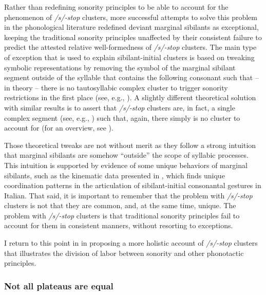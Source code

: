 Rather than redefining sonority principles to be able to account for the phenomenon of \emph{/s/-stop} clusters, more successful attempts to solve this problem in the phonological literature redefined deviant marginal sibilants as exceptional, keeping the traditional sonority principles unaffected by their consistent failure to predict the attested relative well-formedness of \emph{/s/-stop} clusters.
The main type of exception that is used to explain sibilant-initial clusters is based on tweaking symbolic representations by removing the symbol of the marginal sibilant segment outside of the syllable that contains the following consonant such that -- in theory -- there is no tautosyllabic complex cluster to trigger sonority restrictions in the first place (see, e.g., \citealt{steriade1982greek, kaye1992you, rialland1994phonologysk, vaux2009append}).
A slightly different theoretical solution with similar results is to assert that \emph{/s/-stop} clusters are, in fact, a single complex segment (see, e.g., \citealt{fudge1969syllables, weijer1996segmental}) such that, again, there simply is no cluster to account for (for an overview, see \citealt{goad2016sonority}).

Those theoretical tweaks are not without merit as they follow a strong intuition that marginal sibilants are somehow \enquote{outside} the scope of syllabic processes. This intuition is supported by evidence of some unique behaviors of marginal sibilants, such as the kinematic data presented in \citet{hermes2013phonologysk}, which finds unique coordination patterns in the articulation of sibilant-initial consonantal gestures in Italian. That said, it is important to remember that the problem with \emph{/s/-stop} clusters is not that they are common, and, at the same time, unique. The problem with \emph{/s/-stop} clusters is that traditional sonority principles fail to account for them in consistent manners, without resorting to exceptions.

I return to this point in  in proposing a more holistic account of \emph{/s/-stop} clusters that illustrates the division of labor between sonority and other phonotactic principles.

\subsubsection{Not all plateaus are equal}\label{not-all-plateaus-are-equal}


